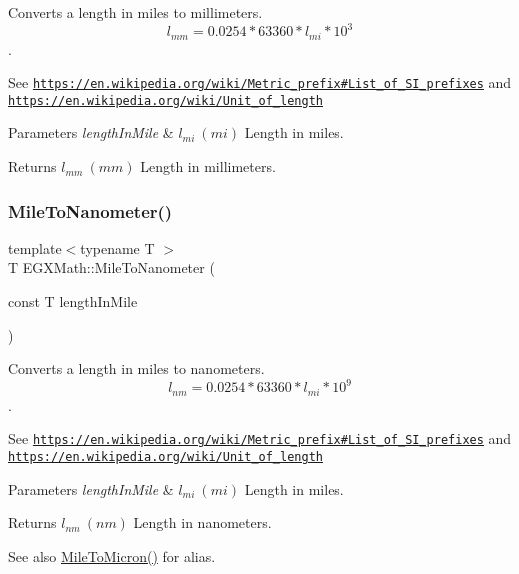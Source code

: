 Converts a length in miles to millimeters. \[ l_{mm}=0.0254 * 63360 * l_{mi} * 10^{3} \]. 

See \href{https://en.wikipedia.org/wiki/Metric_prefix#List_of_SI_prefixes}{\tt https\+://en.\+wikipedia.\+org/wiki/\+Metric\+\_\+prefix\#\+List\+\_\+of\+\_\+\+S\+I\+\_\+prefixes} and \href{https://en.wikipedia.org/wiki/Unit_of_length}{\tt https\+://en.\+wikipedia.\+org/wiki/\+Unit\+\_\+of\+\_\+length} 
\begin{DoxyParams}{Parameters}
{\em length\+In\+Mile} & $ l_{mi}\ (mi)$ Length in miles. \\
\hline
\end{DoxyParams}
\begin{DoxyReturn}{Returns}
$ l_{mm}\ (mm)$ Length in millimeters. 
\end{DoxyReturn}
\mbox{\label{group___e_g_x_math-_conversions-_length_conversions-_imperial-_mile-_s_i_ga7c25082c389858e2dacd450005dc78c7}} 
\subsubsection{\texorpdfstring{Mile\+To\+Nanometer()}{MileToNanometer()}}
{\footnotesize\ttfamily template$<$typename T $>$ \\
T E\+G\+X\+Math\+::\+Mile\+To\+Nanometer (\begin{DoxyParamCaption}\item[{const T}]{length\+In\+Mile }\end{DoxyParamCaption})}



Converts a length in miles to nanometers. \[ l_{nm}=0.0254 * 63360 * l_{mi} * 10^{9} \]. 

See \href{https://en.wikipedia.org/wiki/Metric_prefix#List_of_SI_prefixes}{\tt https\+://en.\+wikipedia.\+org/wiki/\+Metric\+\_\+prefix\#\+List\+\_\+of\+\_\+\+S\+I\+\_\+prefixes} and \href{https://en.wikipedia.org/wiki/Unit_of_length}{\tt https\+://en.\+wikipedia.\+org/wiki/\+Unit\+\_\+of\+\_\+length} 
\begin{DoxyParams}{Parameters}
{\em length\+In\+Mile} & $ l_{mi}\ (mi)$ Length in miles. \\
\hline
\end{DoxyParams}
\begin{DoxyReturn}{Returns}
$ l_{nm}\ (nm)$ Length in nanometers. 
\end{DoxyReturn}
\begin{DoxySeeAlso}{See also}
\mbox{\hyperlink{group___e_g_x_math-_conversions-_length_conversions-_imperial-_mile-_non-_s_i_ga0ab31c74561b6127ec6639c17c5c94e5}{Mile\+To\+Micron()}} for alias. 
\end{DoxySeeAlso}
\mbox{\label{group___e_g_x_math-_conversions-_length_conversions-_imperial-_mile-_s_i_ga3371527a512df8e154f5c3b4703108e0}} 
